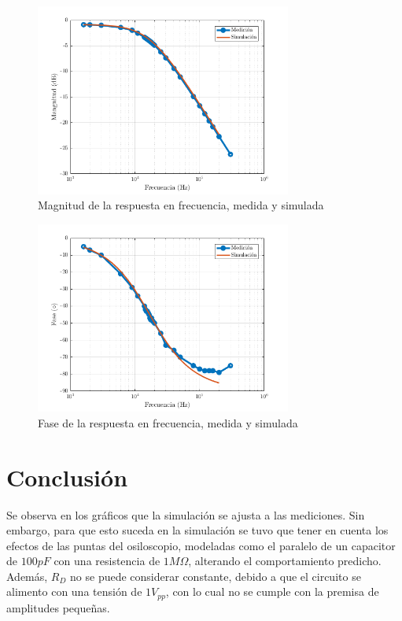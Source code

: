 \documentclass[../../e1_tp1_main.tex]{subfiles}
\begin{document}
\begin{figure}[H]
\centering
\includegraphics[width=0.75\textwidth]{imagenes/mag.png}
\caption{Magnitud de la respuesta en frecuencia, medida y simulada}
\end{figure}

\begin{figure}[H]
\centering
\includegraphics[width=0.75\textwidth]{imagenes/fase.png}
\caption{Fase de la respuesta en frecuencia, medida y simulada}
\end{figure}

\section{Conclusión}

Se observa en los gr\'aficos que la simulaci\'on se ajusta a las mediciones. Sin embargo, para que esto suceda en la simulaci\'on se tuvo que tener en cuenta los efectos de las puntas del osiloscopio, modeladas como el paralelo de un capacitor de $100pF$ con una resistencia de $1M \Omega$, alterando el comportamiento predicho. Adem\'as, $R_D$ no se puede considerar constante, debido a que el circuito se alimento con una tensi\'on  de $1V_{pp}$, con lo cual no se cumple con la premisa de amplitudes peque\~nas.
\end{document}
